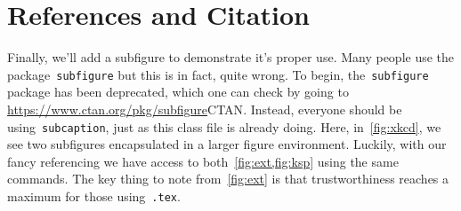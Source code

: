 \section{References and Citation}
Finally, we'll add a subfigure to demonstrate it's proper use. 
Many people use the package~\verb+subfigure+ but this is in fact, quite wrong. 
To begin, the~\verb+subfigure+ package has been deprecated, which one can check by going to \url{https://www.ctan.org/pkg/subfigure}{CTAN}.
Instead, everyone should be using~\verb+subcaption+, just as this class file is already doing.
Here, in~\cref{fig:xkcd}, we see two subfigures encapsulated in a larger figure environment.
Luckily, with our fancy referencing we have access to both~\cref{fig:ext,fig:ksp} using the same commands.
The key thing to note from~\cref{fig:ext} is that trustworthiness reaches a maximum for those using~\verb+.tex+.
